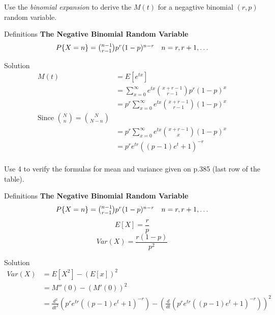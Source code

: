\documentclass{article}
\begin{document}
\begin{spacing}{1.1}
\newpage
\begin{homeworkProblem}
  Use the \emph{binomial expansion} to derive the $M(t)$ for a negagtive
  binomial $(r, p)$ random variable.
  \begin{homeworkSection}{Definitions}
    {\bf The Negative Binomial Random Variable}
    \[\begin{array}{l l} P\{X = n\} = {n - 1 \choose r - 1} p^r (1 - p)^{n - r} & n = r, r + 1, \dots \end{array}\]
  \end{homeworkSection}
  \begin{homeworkSection}{Solution}
    \begin{align*}
      M(t) &= E[ e^{tx}]\\
      &= \sum\limits_{x = 0}^{\infty} e^{t x} {x + r - 1 \choose r - 1} p^r (1 - p)^{x}\\
      &= p^r \sum\limits_{x = 0}^{\infty} e^{t x} {x + r - 1 \choose r - 1} (1 - p)^{x}\\
      \text{Since ${N \choose n} = {N \choose N - n}$}\\
      &= p^r \sum\limits_{x = 0}^{\infty} e^{t x} {x + r - 1 \choose x} (1 - p)^{x}\\
      &= p^r e^{t r}( (p - 1) e^t + 1)^{-r}\\
    \end{align*}
  \end{homeworkSection}
\end{homeworkProblem}
\newpage
\begin{homeworkProblem}
  Use 4 to verify the formulas for mean and variance given on p.385 
  (last row of the table).
  \begin{homeworkSection}{Definitions}
    {\bf The Negative Binomial Random Variable}
    \[\begin{array}{l l} P\{X = n\} = {n - 1 \choose r - 1} p^r (1 - p)^{n - r} & n = r, r + 1, \dots \end{array}\]
    \[E[X] = \frac{ r}{ p}\]
    \[Var(X) = \frac{ r(1 - p)}{ p^2}\]
  \end{homeworkSection}
  \begin{homeworkSection}{Solution}
    \begin{align*}
      Var(X) &= E[ X^2] - (E[x])^2\\
      &= M''(0) - (M'(0))^2\\
      &= \frac{ d^2}{ dt^2} (p^r e^{t r}( (p - 1) e^t + 1)^{-r}) - \left(\frac{ d}{ dt}(p^r e^{t r}( (p - 1) e^t + 1)^{-r})\right)^2\\

\end{align*}
\end{homeworkSection}
\end{homeworkProblem}
\end{spacing}
\end{document}
